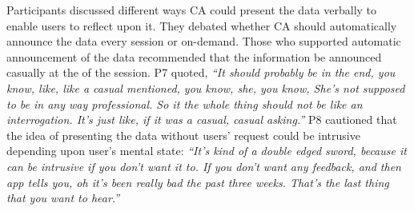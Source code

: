         Participants discussed different ways \ac{CA} could present the data verbally to enable users to reflect upon it. 
        They debated whether \ac{CA} should automatically announce the data every session or on-demand. 
        Those who supported automatic announcement of the data recommended that the information be announced casually at the of the session. P7 quoted,
        \textit{``It should probably be in the end, you know, like, like a casual mentioned, you know, she, you know, 
        She's not supposed to be in any way professional. So it the whole thing should not be like an interrogation. It's just like, if it was a casual, casual asking.''}
        P8 cautioned that the idea of presenting the data without users' request could be intrusive depending upon user's mental state:
        \textit{``It's kind of a double edged sword, because it can be intrusive if you don't want it to. If you don't want any feedback, and then \acl{app} tells you, oh it's been really bad the past three weeks. That's the last thing that you want to hear.''}


